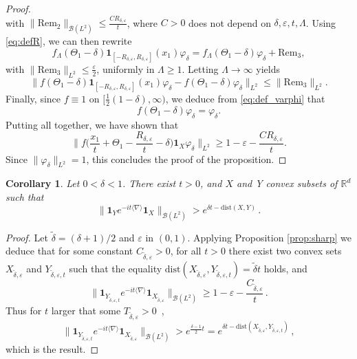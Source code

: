 \documentclass[12pt]{article}
\theoremstyle{plain}
\newtheorem{cor}[theo]{Corollary}
\begin{document}
\begin{proof}
\begin{equation*}
    \end{equation*}
    with $\|\mathrm{Rem}_2\|_{\mathcal{B}(L^2)}\le \frac{CR_{\delta,\varepsilon}}{t}$, where $C>0$ does not depend on $\delta,\varepsilon,t,\Lambda$. Using \eqref{eq:defR}, we can then rewrite
    \begin{equation*}
        f_\Lambda(\Theta_1-\delta) \mathbf{1}_{[-R_{\delta,\varepsilon},R_{\delta,\varepsilon}]}(x_1)\varphi_\delta=f_\Lambda(\Theta_1-\delta) \varphi_\delta+\mathrm{Rem}_3,
    \end{equation*}
    with $\|\mathrm{Rem}_3\|_{L^2}\le\frac\varepsilon2$, uniformly in $\Lambda\ge1$. Letting $\Lambda\to\infty$ yields
    \begin{equation*}
        \big\|f(\Theta_1-\delta) \mathbf{1}_{[-R_{\delta,\varepsilon},R_{\delta,\varepsilon}]}(x_1)\varphi_\delta-f(\Theta_1-\delta) \varphi_\delta\big\|_{L^2}\le\|\mathrm{Rem}_3\|_{L^2}.
    \end{equation*}
    Finally, since $f\equiv1$ on $[\frac12(1-\delta),\infty)$, we deduce from \eqref{eq:def_varphi} that
    \begin{equation*}
        f(\Theta_1-\delta) \varphi_\delta=\varphi_\delta.
    \end{equation*}
Putting all together, we have shown  that
    \begin{equation*}
        \Big\|f\Big(\frac{x_1}{t}+\Theta_1-\frac{R_{\delta,\varepsilon}}{t}-\delta\Big) \mathbf{1}_X\varphi_\delta\Big\|_{L^2}\ge1-\varepsilon-\frac{CR_{\delta,\varepsilon}}{t}.
    \end{equation*}
    Since $\|\varphi_\delta\|_{L^2}=1$, this concludes the proof of the proposition.
\end{proof}

\begin{cor}\label{cor:sharp}
Let $0<\delta<1$. There exist $t>0$, and $X$ and Y convex subsets
of $\mathbb{R}^{d}$ such that
\[
\|\boldsymbol{1}_{Y}e^{-it\langle\nabla\rangle}\boldsymbol{1}_{X}\|_{\mathcal{B}(L^{2})}>e^{\delta t-\mathrm{dist}(X,Y)}\,.
\]
\end{cor}
%
\begin{proof}
Let $\tilde{\delta}=(\delta+1)/2$ and $\varepsilon$ in $(0,1)$.
Applying Proposition \ref{prop:sharp} we deduce that for some constant $C_{\tilde{\delta},\varepsilon}>0$,
for all $t>0$ there exist two convex sets $X_{\tilde{\delta},\varepsilon}$
and $Y_{\tilde{\delta},\varepsilon,t}$ such that the equality $\mathrm{dist}(X_{\tilde{\delta},\varepsilon},Y_{\tilde{\delta},\varepsilon,t})=\tilde{\delta}t$ holds, 
and
\[
\|\boldsymbol{1}_{Y_{\tilde{\delta},\varepsilon,t}}e^{-it\langle\nabla\rangle}\boldsymbol{1}_{X_{\tilde{\delta},\varepsilon}}\|_{\mathcal{B}(L^{2})}\geq1-\varepsilon-\frac{C_{\tilde{\delta},\varepsilon}}{t}\,.
\]
Thus for $t$ larger that some $T_{\tilde{\delta},\varepsilon}>0$~,
\[
\|\boldsymbol{1}_{Y_{\tilde{\delta},\varepsilon,t}}e^{-it\langle\nabla\rangle}\boldsymbol{1}_{X_{\tilde{\delta},\varepsilon}}\|_{\mathcal{B}(L^{2})}>e^{\frac{\delta-1}{2}t}=e^{\delta t-\mathrm{dist}(X_{\tilde{\delta},\varepsilon},Y_{\tilde{\delta},\varepsilon,t})}\,,
\]
which is the result.
\end{proof}


\doclicenseThis
\end{document}
